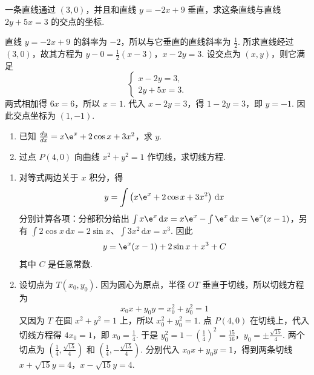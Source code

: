 \begin{problem}
一条直线通过 \( \left( 3,0 \right) \)，并且和直线 \( y=-2x+9 \) 垂直，求这条直线与直线 \( 2y+5x=3 \) 的交点的坐标.
\end{problem}

\begin{solution}
直线 \(y=-2x+9\) 的斜率为 \(-2\)，所以与它垂直的直线斜率为 \(\frac12\). 所求直线经过 \((3,0)\)，故其方程为
\(y-0=\frac12\left(x-3\right)\)，\(x-2y=3\).
设交点为 \((x,y)\)，则它满足
\[
\begin{cases}
 x-2y=3,\\
 2y+5x=3.
\end{cases}
\]
两式相加得 \(6x=6\)，所以 \(x=1\). 代入 \(x-2y=3\)，得 \(1-2y=3\)，即 \(y=-1\). 因此交点坐标为 \((1,-1)\).
\end{solution}


\begin{problem}
\begin{enumerate}
    \item 已知 \( \frac{dy}{dx}=x\e^x+2\cos x+3x^2 \)，求 \( y \).
    \item 过点 \( P\left( 4,0 \right) \) 向曲线 \( x^2+y^2=1 \) 作切线，求切线方程.
\end{enumerate}
\end{problem}

\begin{solution}
\begin{enumerate}
    \item 对等式两边关于 \(x\) 积分，得
    \[
    y=\int\left(x\e^x+2\cos x+3x^2\right)\,\mathrm dx
    \]
    分别计算各项：分部积分给出
    \(\int x\e^x\,\mathrm dx=x\e^x-\int\e^x\,\mathrm dx=\e^x(x-1)\)，另有
    \(\int2\cos x\,\mathrm dx=2\sin x\)、\(\int3x^2\,\mathrm dx=x^3\). 因此
    \[
    y=\e^x(x-1)+2\sin x+x^3+C
    \]
    其中 \(C\) 是任意常数.

    \item 设切点为 \(T\left(x_0,y_0\right)\). 因为圆心为原点，半径 \(OT\) 垂直于切线，所以切线方程为
    \[
    x_0x+y_0y=x_0^2+y_0^2=1
    \]
    又因为 \(T\) 在圆 \(x^2+y^2=1\) 上，所以 \(x_0^2+y_0^2=1\). 点 \(P(4,0)\) 在切线上，代入切线方程得 \(4x_0=1\)，即 \(x_0=\frac14\). 于是
\(y_0^2=1-\left(\frac14\right)^2=\frac{15}{16}\)，\(y_0=\pm\frac{\sqrt{15}}4\).
    两个切点为 \(\left(\frac14,\frac{\sqrt{15}}4\right)\) 和 \(\left(\frac14,-\frac{\sqrt{15}}4\right)\). 分别代入 \(x_0x+y_0y=1\)，得到两条切线
\(x+\sqrt{15}y=4\)，\(x-\sqrt{15}y=4\).
\end{enumerate}
\end{solution}
